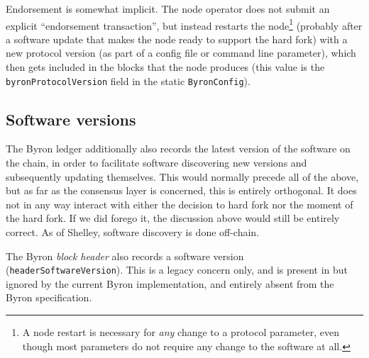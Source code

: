 Endorsement is somewhat implicit. The node operator does not submit an explicit
``endorsement transaction'', but instead restarts the
node\footnote{\label{byron:unnecessary-restarts}A node restart is necessary for
\emph{any} change to a protocol parameter, even though most parameters do not
require any change to the software at all.} (probably after a software update
that makes the node ready to support the hard fork) with a new protocol version
(as part of a config file or command line parameter), which then gets included
in the blocks that the node produces (this value is the
\lstinline!byronProtocolVersion! field in the static \lstinline!ByronConfig!).

\subsection{Software versions}

The Byron ledger additionally also records the latest version of the software on
the chain, in order to facilitate software discovering new versions and
subsequently updating themselves. This would normally precede all of the above,
but as far as the consensus layer is concerned, this is entirely orthogonal. It
does not in any way interact with either the decision to hard fork nor the
moment of the hard fork. If we did forego it, the discussion above would still
be entirely correct. As of Shelley, software discovery is done off-chain.

The Byron \emph{block header} also records a software version
(\lstinline!headerSoftwareVersion!). This is a legacy concern only, and is
present in but ignored by the current Byron implementation, and entirely absent
from the Byron specification.
